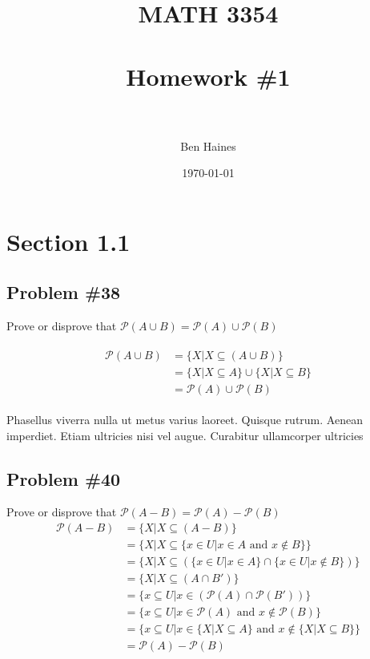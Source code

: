 \documentclass[paper=a4, fontsize=11pt]{scrartcl} %
\title{   
\normalfont \normalsize
\textsc{MATH 3354} \\ [25pt] %
\horrule{0.5pt} \\[0.4cm] %
\huge Homework \#1 \\ %
\horrule{2pt} \\[0.5cm] %
}
\author{Ben Haines} %
\date{\normalsize\today} %
\numberwithin{equation}{section} %
\numberwithin{figure}{section} %
\numberwithin{table}{section} %
\begin{document}
\maketitle %


\section{Section 1.1}
\subsection{Problem \#38}
Prove or disprove that  $\mathcal P \left({A \cup B}\right) = \mathcal P \left({A}\right) \cup \mathcal P \left({B}\right)$

\begin{align}
\begin{split}
\mathcal P \left({A \cup B}\right)
&= \{X|X \subseteq (A \cup B)\}\\
&=\{X|X \subseteq A\} \cup \{X|X \subseteq B\}\\
&=\mathcal P \left({A}\right) \cup \mathcal P \left({B}\right)
\end{split}                   
\end{align}

Phasellus viverra nulla ut metus varius laoreet. Quisque rutrum. Aenean imperdiet. Etiam ultricies nisi vel augue. Curabitur ullamcorper ultricies


\subsection{Problem \#40}

Prove or disprove that $\mathcal P \left({A - B}\right) = \mathcal P \left({A}\right) - \mathcal P \left({B}\right)$
\begin{align}
\mathcal P \left({A - B}\right)
&= \{X|X \subseteq (A - B)\}\\
&= \{X|X \subseteq \{x \in U | x \in A \text{ and } x \not\in B\}\}\\
&= \{X|X \subseteq (\{x \in U | x \in A\} \cap \{x \in U | x \not\in B\})\}\\
&= \{X|X \subseteq (A \cap B')\}\\
&= \{x \subseteq U | x \in (\mathcal P \left({A}\right) \cap \mathcal P \left({B'}\right)) \}\\
&= \{x \subseteq U | x \in \mathcal P \left({A}\right) \text{ and } x \not\in \mathcal P \left({B}\right) \}\\
&= \{x \subseteq  U | x \in \{X|X \subseteq A\} \text{ and } x \not\in \{X|X \subseteq B \}\}\\
&= \mathcal P(A) - \mathcal P(B)
\end{align}
\end{document}
